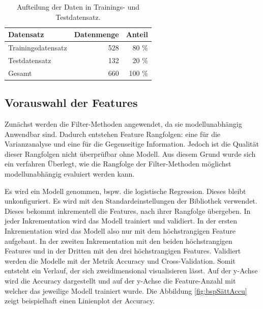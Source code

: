 \begin{table}[ht]
    \centering
    \caption{Aufteilung der Daten in Trainings- und Testdatensatz.}
    \begin{tabular}{|l|r|r|}
        \hline
        Datensatz & Datenmenge & Anteil \\
        \hline
        Trainingsdatensatz & 528 & 80 \%\\
        Testdatensatz & 132 & 20 \%\\
        \hline
        \hline
        Gesamt & 660 & 100 \%\\
        \hline
    \end{tabular}
    \label{tab:TrainTestSplit}
\end{table}

\subsection{Vorauswahl der Features} \label{sec:Meth FeatVorSele}
Zunächst werden die Filter-Methoden angewendet, da sie modellunabhängig Anwendbar sind. Dadurch entstehen  Feature Rangfolgen: eine für die Varianzanalyse und eine für die Gegenseitige Information. Jedoch ist die Qualität dieser Rangfolgen nicht überprüfbar ohne Modell. Aus diesem Grund wurde sich ein verfahren Überlegt, wie die Rangfolge der Filter-Methoden möglichst modellunabhängig evaluiert werden kann. \par

Es wird ein Modell genommen, bspw. die logistische Regression. Dieses bleibt unkonfiguriert. Es wird mit den Standardeinstellungen der \gls{Bibliothek} verwendet. Dieses bekommt inkrementell die Features, nach ihrer Rangfolge übergeben. In jeder Inkrementation wird das Modell trainiert und validiert. In der ersten Inkrementation wird das Modell also nur mit dem höchstrangigen Feature aufgebaut. In der zweiten Inkrementation mit den beiden höchstrangigen Features und in der Dritten mit den drei höchstrangigen Features. Validiert werden die Modelle mit der Metrik Accuracy und Cross-Validation. Somit entsteht ein Verlauf, der sich zweidimensional visualisieren lässt. Auf der y-Achse wird die Accuracy dargestellt und auf der y-Achse die Feature-Anzahl mit welcher das jeweilige Modell trainiert wurde. Die Abbildung \ref{fig:bspSättAccu} zeigt beispielhaft einen Linienplot der Accuracy. 

